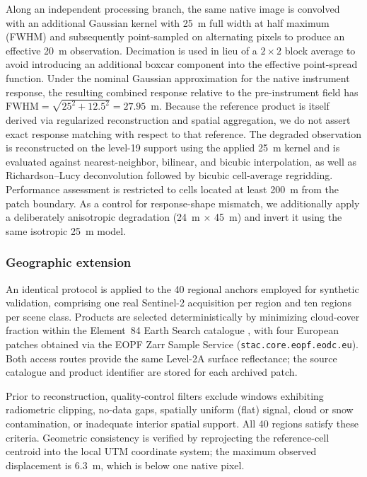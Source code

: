 \documentclass[journal]{IEEEtran}
\begin{document}
Along an independent processing branch, the same native image is convolved with an additional Gaussian kernel with 25~m full width at half maximum (FWHM) and subsequently point-sampled on alternating pixels to produce an effective 20~m observation. Decimation is used in lieu of a $2\times2$ block average to avoid introducing an additional boxcar component into the effective point-spread function. Under the nominal Gaussian approximation for the native instrument response, the resulting combined response relative to the pre-instrument field has $\mathrm{FWHM}=\sqrt{25^2+12.5^2}=27.95$~m. Because the reference product is itself derived via regularized reconstruction and spatial aggregation, we do not assert exact response matching with respect to that reference. The degraded observation is reconstructed on the level-19 support using the applied 25~m kernel and is evaluated against nearest-neighbor, bilinear, and bicubic interpolation, as well as Richardson--Lucy deconvolution followed by bicubic cell-average regridding. Performance assessment is restricted to cells located at least 200~m from the patch boundary. As a control for response-shape mismatch, we additionally apply a deliberately anisotropic degradation (24~m $\times$ 45~m) and invert it using the same isotropic 25~m model.

\subsubsection{Geographic extension}
\label{sec:real_downscale_multiregion}

An identical protocol is applied to the 40 regional anchors employed for synthetic validation, comprising one real Sentinel-2 acquisition per region and ten regions per scene class. Products are selected deterministically by minimizing cloud-cover fraction within the Element~84 Earth Search catalogue \cite{earthsearch}, with four European patches obtained via the EOPF Zarr Sample Service (\texttt{stac.core.eopf.eodc.eu}). Both access routes provide the same Level-2A surface reflectance; the source catalogue and product identifier are stored for each archived patch.

Prior to reconstruction, quality-control filters exclude windows exhibiting radiometric clipping, no-data gaps, spatially uniform (flat) signal, cloud or snow contamination, or inadequate interior spatial support. All 40 regions satisfy these criteria. Geometric consistency is verified by reprojecting the reference-cell centroid into the local UTM coordinate system; the maximum observed displacement is 6.3~m, which is below one native pixel.
\end{document}
